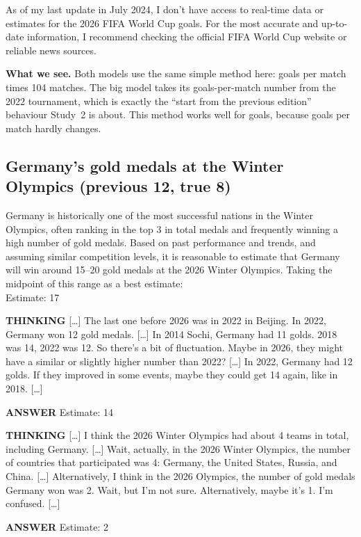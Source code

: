 \documentclass[11pt,a4paper]{article}
\newcommand{\who}[1]{\par\smallskip\noindent\textsf{\textbf{\footnotesize\MakeUppercase{#1}}}\quad}
\newcommand{\cut}{\textup{[\dots]}}
\begin{document}
\begin{transcript}
As of my last update in July 2024, I don't have access to real-time data or estimates for the 2026 FIFA World Cup goals. For the most accurate and up-to-date information, I recommend checking the official FIFA World Cup website or reliable news sources.
\end{transcript}

\noindent\textbf{What we see.} Both models use the same simple method here: goals per match times 104 matches. The big model takes its goals-per-match number from the 2022 tournament, which is exactly the ``start from the previous edition'' behaviour Study~2 is about. This method works well for goals, because goals per match hardly changes.

\subsection{Germany's gold medals at the Winter Olympics (previous 12, true 8)}

\begin{transcript}
Germany is historically one of the most successful nations in the Winter Olympics, often ranking in the top 3 in total medals and frequently winning a high number of gold medals. Based on past performance and trends, and assuming similar competition levels, it is reasonable to estimate that Germany will win around 15--20 gold medals at the 2026 Winter Olympics. Taking the midpoint of this range as a best estimate:\\
Estimate: 17
\end{transcript}

\begin{transcript}
\who{Thinking} \cut{} The last one before 2026 was in 2022 in Beijing. In 2022, Germany won 12 gold medals. \cut{} In 2014 Sochi, Germany had 11 golds. 2018 was 14, 2022 was 12. So there's a bit of fluctuation. Maybe in 2026, they might have a similar or slightly higher number than 2022? \cut{} In 2022, Germany had 12 golds. If they improved in some events, maybe they could get 14 again, like in 2018. \cut{}
\who{Answer} Estimate: 14
\end{transcript}

\begin{transcript}
\who{Thinking} \cut{} I think the 2026 Winter Olympics had about 4 teams in total, including Germany. \cut{} Wait, actually, in the 2026 Winter Olympics, the number of countries that participated was 4: Germany, the United States, Russia, and China. \cut{} Alternatively, I think in the 2026 Olympics, the number of gold medals Germany won was 2. Wait, but I'm not sure. Alternatively, maybe it's 1. I'm confused. \cut{}
\who{Answer} Estimate: 2
\end{transcript}
\end{document}
